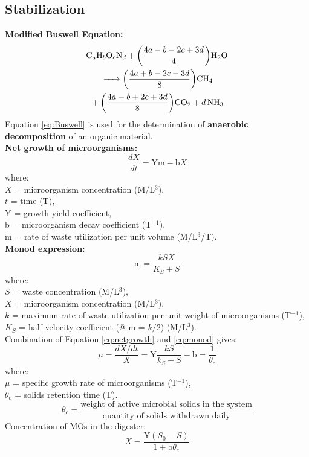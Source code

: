 \documentclass[a4paper, landscape, 8pt]{extarticle}
\begin{document}
\begin{multicols}{4}
\section*{Stabilization}
\textbf{Modified Buswell Equation:}
\begin{multline}
\ce{C_aH_bO_cN_d + $\left(\frac{4a - b - 2c + 3d}{4}\right)$H2O\\ -> $\left(\frac{4a + b - 2c - 3d}{8}\right)$CH4 \\+ $\left(\frac{4a - b + 2c + 3d}{8}\right)$CO2 + $d$NH3} \label{eq:Buswell}
\end{multline}
Equation \ref{eq:Buswell} is used for the determination of \textbf{anaerobic decomposition} of an organic material.\\
\textbf{Net growth of microorganisms:}
\begin{equation}
    \frac{dX}{dt} = \text{Ym} - \text{b}X
    \label{eq:netgrowth}
\end{equation}
where:\\
$X$ = microorganism concentration (M/L$^3$),\\
$t$ = time (T),\\
Y = growth yield coefficient,\\
b = microorganism decay coefficient (T$^{-1}$),\\
m = rate of waste utilization per unit volume (M/L$^3$/T).\\
\textbf{Monod expression:}
\begin{equation}
    \text{m} = \frac{kSX}{K_S+S}
    \label{eq:monod}
\end{equation}
where:\\
$S$ = waste concentration (M/L$^3$),\\
$X$ = microorganism concentration (M/L$^3$),\\
$k$ = maximum rate of waste utilization per unit weight of microorganisms (T$^{-1}$),\\
$K_S$ = half velocity coefficient (@ m = $k/2$) (M/L$^3$).\\
Combination of Equation \ref{eq:netgrowth} and \ref{eq:monod} gives:
\[
\mu = \frac{dX/dt}{X} = \text{Y}\frac{kS}{k_S+S} - \text{b} = \frac{1}{\theta_c}
\]
where:\\
$\mu$ = specific growth rate of microorganisms (T$^{-1}$),\\
$\theta_c$ = solids retention time (T).
\[
\theta_c = \frac{\text{weight of active microbial solids in the system}}{\text{quantity of solids withdrawn daily}}
\]
Concentration of MOs in the digester:
\[
X = \frac{\text{Y}(S_0-S)}{1+\text{b}\theta_c}
\]
\end{multicols}
\end{document}
